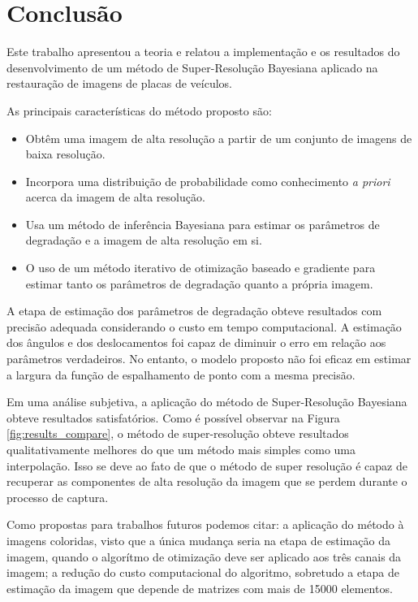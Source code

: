 \chapter{Conclusão}
Este trabalho apresentou a teoria e relatou a implementação e os resultados do desenvolvimento de um método de Super-Resolução Bayesiana aplicado na restauração de imagens de placas de veículos.

As principais características do método proposto são:
\begin{itemize}
	\item Obtêm uma imagem de alta resolução a partir de um conjunto de imagens de baixa resolução.
	\item Incorpora uma distribuição de probabilidade como conhecimento \emph{a priori} acerca da imagem de alta resolução.
	\item Usa um método de inferência Bayesiana para estimar os parâmetros de degradação e a imagem de alta resolução em si.
	\item O uso de um método iterativo de otimização baseado e gradiente para estimar tanto os parâmetros de degradação quanto a própria imagem.

\end{itemize}

A etapa de estimação dos parâmetros de degradação obteve resultados com precisão adequada considerando o custo em tempo computacional.
A estimação dos ângulos e dos deslocamentos foi capaz de diminuir o erro em relação aos parâmetros verdadeiros.
No entanto, o modelo proposto não foi eficaz em estimar a largura da função de espalhamento de ponto com a mesma precisão.

Em uma análise subjetiva, a aplicação do método de Super-Resolução Bayesiana obteve resultados satisfatórios. 
Como é possível observar na Figura \ref{fig:results_compare}, o método de super-resolução obteve resultados qualitativamente melhores do que um método mais simples como uma interpolação. Isso se deve ao fato de que o método de super resolução é capaz de recuperar as componentes de alta resolução da imagem que se perdem durante o processo de captura.

Como propostas para trabalhos futuros podemos citar: a aplicação do método à imagens
coloridas, visto que a única mudança seria na etapa de estimação da imagem,
quando o algorítmo de otimização deve ser aplicado aos três canais da imagem;
a redução do custo computacional do algoritmo, sobretudo a etapa de estimação da imagem
que depende de matrizes com mais de 15000 elementos.

